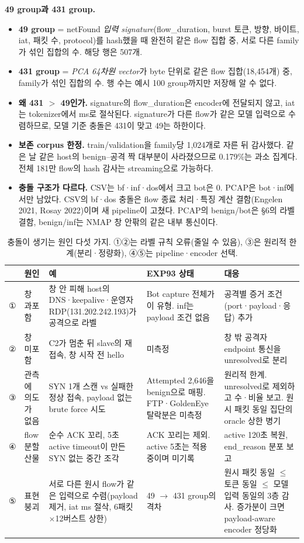 \textbf{49 group과 431 group.}
\begin{itemize}
\item \textbf{49 group} = netFound \emph{입력 signature}(flow\_duration, burst 토큰, 방향, 바이트, iat, 패킷 수, protocol)를 hash했을 때 완전히 같은 flow 집합 중, 서로 다른 family가 섞인 집합의 수. 해당 행은 507개.
\item \textbf{431 group} = \emph{PCA 64차원 vector}가 byte 단위로 같은 flow 집합(18,454개) 중, family가 섞인 집합의 수. 행 수는 예시 100 group까지만 저장해 알 수 없다.
\item \textbf{왜 431 $>$ 49인가.} signature의 flow\_duration은 encoder에 전달되지 않고, iat는 tokenizer에서 ms로 절삭된다. signature가 다른 flow가 같은 모델 입력으로 수렴하므로, 모델 기준 충돌은 431이 맞고 49는 하한이다.
\item \textbf{보존 corpus 한정.} train/validation을 family당 1,024개로 자른 뒤 감사했다. 같은 날 같은 host의 benign--공격 짝 대부분이 사라졌으므로 0.179\%는 과소 집계다. 전체 181만 flow의 hash 감사는 streaming으로 가능하다.
\item \textbf{충돌 구조가 다르다.} CSV는 bf·inf·dos에서 크고 bot은 0. PCAP은 bot·inf에서만 남았다. CSV의 bf·dos 충돌은 flow 종료 처리·특징 계산 결함(Engelen 2021, Rosay 2022)이며 새 pipeline이 고쳤다. PCAP의 benign/bot은 \S6의 라벨 결함, benign/inf는 NMAP 창 안팎의 같은 내부 통신이다.
\end{itemize}

\begin{table}[H]
\centering\small
\caption{충돌이 생기는 원인 다섯 가지. ①②는 라벨 규칙 오류(줄일 수 있음), ③은 원리적 한계(분리·정량화), ④⑤는 pipeline·encoder 선택.}
\begin{tabularx}{\linewidth}{p{.03\linewidth}p{.15\linewidth}YYp{.22\linewidth}}
\toprule & 원인 & 예 & EXP93 상태 & 대응\\\midrule
① & 창 과포함 & 창 안 피해 host의 DNS·keepalive·운영자 RDP(131.202.242.193)가 공격으로 라벨 & Bot capture 전체가 이 유형. inf는 payload 조건 없음 & 공격별 증거 조건(port·payload·응답) 추가\\
② & 창 미포함 & C2가 멈춘 뒤 slave의 재접속, 창 시작 전 hello & 미측정 & 창 밖 공격자 endpoint 통신을 unresolved로 분리\\
③ & 관측에 의도가 없음 & SYN 1개 스캔 vs 실패한 정상 접속, payload 없는 brute force 시도 & Attempted 2,646을 benign으로 매핑. FTP·GoldenEye 탈락분은 미측정 & 원리적 한계. unresolved로 제외하고 수·비율 보고. 원시 패킷 동일 집단의 oracle 상한 병기\\
④ & flow 분할 산물 & 순수 ACK 꼬리, 5초 active timeout이 만든 SYN 없는 중간 조각 & ACK 꼬리는 제외. active 5초는 적용 중이며 미기록 & active 120초 복원, end\_reason 분포 보고\\
⑤ & 표현 붕괴 & 서로 다른 원시 flow가 같은 입력으로 수렴(payload 제거, iat ms 절삭, 6패킷$\times$12버스트 상한) & 49 $\to$ 431 group의 격차 & 원시 패킷 동일 $\le$ 토큰 동일 $\le$ 모델 입력 동일의 3층 감사. 증가분이 크면 payload-aware encoder 정당화\\
\bottomrule
\end{tabularx}
\end{table}

